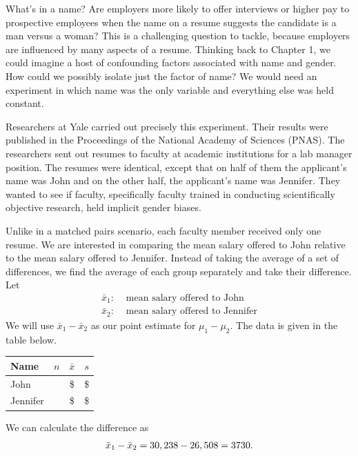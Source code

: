 What's in a name?  Are employers more likely to offer interviews or higher pay to prospective employees when the name on a resume suggests the candidate is a man versus a woman?  This is a challenging question to tackle, because employers are influenced by many aspects of a resume.  Thinking back to Chapter 1, we could imagine a host of confounding factors associated with name and gender.  How could we possibly isolate just the factor of name?  We would need an experiment in which name was the only variable and everything else was held constant.

Researchers at Yale carried out precisely this experiment.
Their results were published in the Proceedings of the
National Academy of Sciences (PNAS).
The researchers sent out resumes to faculty at academic institutions
for a lab manager position.
The resumes were identical, except that on half of them the applicant's name
was John and on the other half, the applicant's name was Jennifer.
They wanted to see if faculty, specifically faculty trained in conducting
scientifically objective research, held implicit gender biases.

Unlike in a matched pairs scenario, each faculty member received only one resume.  We are interested in comparing the mean salary offered to John relative to the mean salary offered to Jennifer.  Instead of taking the average of a set of differences, we find the average of each group separately and take their difference.  Let
\begin{align*}
\bar{x}_1:& \text{ mean salary offered to John}\\
\bar{x}_2: &\text{ mean salary offered to Jennifer}
\end{align*}
We will use $\bar{x}_1 - \bar{x}_2$ as our point estimate for $\mu_1-\mu_2$.  The data is given in the table below.

\begin{center}
\begin{tabular}{l ccc}
\hline
Name\hspace{2mm}	& $n$	& $\bar{x}$	& $s$	\\
\hline 
John		& \johnn{}		& 		 \$\johnmean{} 	& \$\johnsd{}		 \\
Jennifer		& \jennifern{}		& \$\jennifermean{}		& \$\jennifersd{}		 \\
\hline
\end{tabular}
\end{center}
\label{summaryStatsForJohnJenniferStudy}
We can calculate the difference as 
\begin{align*}
 \bar{x}_1-\bar{x}_2 = 30,238{} - 26,508{} = 3730.
\end{align*}

